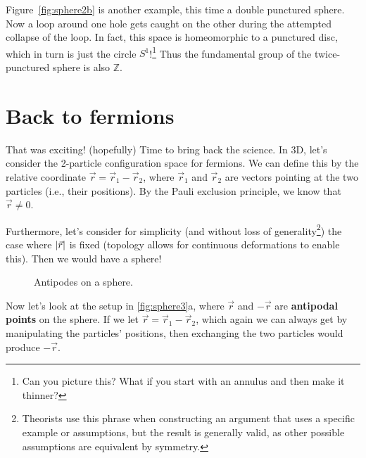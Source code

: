 \documentclass[12pt, english]{book}
\begin{document}
Figure~\ref{fig:sphere2b} is another example, this time a double punctured sphere.
Now a loop around one hole gets caught on the other during the attempted collapse of the loop.
In fact, this space is homeomorphic to a punctured disc, which in turn is just the circle $S^1$!\footnote{Can you picture this? What if you start with an annulus and then make it thinner?} 
Thus the fundamental group of the twice-punctured sphere is also $\mathbb{Z}$.



\section{Back to fermions}

That was exciting! (hopefully)
Time to bring back the science.
In 3D, let's consider the 2-particle configuration space for fermions.
We can define this by the relative coordinate $\vec{r} = \vec{r}_1 - \vec{r}_2$, where $\vec{r}_1$ and $\vec{r}_2$ are vectors pointing at the two particles (i.e., their positions).
By the Pauli exclusion principle, we know that $\vec{r} \neq 0$.

Furthermore, let's consider for simplicity (and without loss of generality\footnote{Theorists use this phrase when constructing an argument that uses a specific example or assumptions, but the result is generally valid, as other possible assumptions are equivalent by symmetry.}) the case where $\abs{\vec{r}}$ is fixed (topology allows for continuous deformations to enable this).
Then we would have a sphere!

\begin{figure}[!ht]
	\centering 
	 \hspace{5ex} 
	\caption{Antipodes on a sphere.}
	\label{fig:sphere3}
\end{figure}

Now let's look at the setup in \autoref{fig:sphere3}a, where $\vec{r}$ and $-\vec{r}$ are \textbf{antipodal points} on the sphere.
If we let $\vec{r} = \vec{r}_1 - \vec{r}_2$, which again we can always get by manipulating the particles' positions, then exchanging the two particles would produce $-\vec{r}$.
\end{document}
